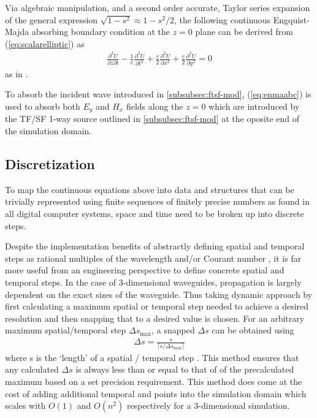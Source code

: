 Via algebraic manipulation, and a second order accurate, Taylor series expansion of the general expression $\sqrt{1-s^2}\approx1-s^2/2$, the following continuous Engquist-Majda absorbing boundary condition at the $z=0$ plane can be derived from  (\ref{eq:scalarelliptic}) as
\begin{align}
	\frac{\partial^2 U}{\partial z\partial t}-\frac{1}{c}\frac{\partial^2 U}{\partial t^2}+\frac{c}{2}\frac{\partial^2 U}{\partial x^2}+\frac{c}{2}\frac{\partial^2 U}{\partial y^2}=0
	\label{eq:enmaabc}
\end{align}
as in \cite{taftlovefdtd}.

To absorb the incident wave introduced in \ref{subsubsec:ftsf-mod},  (\ref{eq:enmaabc}) is used to absorb both $E_y$ and $H_x$ fields along the $z=0$ which are introduced by the TF/SF 1-way source outlined in \ref{subsubsec:ftsf-mod} at the oposite end of the simulation domain.

\subsection{Discretization}
\label{subsec:discretization}
To map the continuous equations above into data and structures that can be trivially represented using finite sequences of finitely precise numbers as found in all digital computer systems, space and time need to be broken up into discrete steps.

Despite the implementation benefits of abstractly defining spatial and temporal steps as rational multiples of the wavelength and/or Courant number \cite{ufdtd}, it is far more useful from an engineering perspective to define concrete spatial and temporal steps. In the case of 3-dimensional waveguides, propagation is largely dependent on the exact sizes of the waveguide. Thus taking dynamic approach by first calculating a maximum spatial or temporal step needed to achieve a desired resolution and then snapping that to a desired value is chosen. For an arbitrary maximum spatial/temporal step $\Delta s_{\max}$, a snapped $\Delta s$ can be obtained using
\begin{align}
	\Delta s = \frac{s}{\lceil s / \Delta s_{\max}\rceil}
	\label{eq:snapping}
\end{align}
where s is the `length' of a spatial / temporal step \cite{empossible}. This method ensures that any calculated $\Delta s$ is always less than or equal to that of of the precalculated maximum based on a set precision requirement. This method does come at the cost of adding additional temporal and points into the simulation domain which scales with $O(1)$ and $O(n^2)$ respectively for a 3-dimensional simulation.

